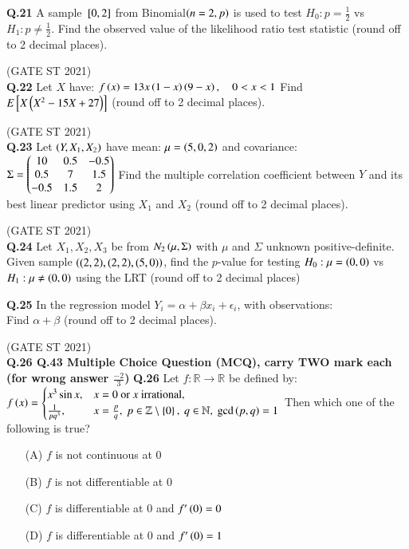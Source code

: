 \documentclass[journal,12pt,onecolumn]{IEEEtran}
\theoremstyle{remark}
\begin{document}
\textbf{Q.21}
A sample ${}\left[0,2\right]$ from Binomial$\left(n=2,p\right)$ is used to test $H_0: p = \frac12$ vs $H_1: p \ne \frac12$.  
Find the observed value of the likelihood ratio test statistic (round off to 2 decimal places).

\hfill (GATE ST 2021) \\

\textbf{Q.22}
Let $X$ have:
$
f\left(x\right) = 13x\left(1-x\right)\left(9-x\right), \quad 0 < x < 1
$
Find $E{}\left[ X\left(X^2 - 15X + 27\right)\right]$ (round off to 2 decimal places).

\hfill (GATE ST 2021) \\

\textbf{Q.23}
Let $\left(Y, X_1, X_2\right)$ have mean:
$
\mu = \left(5,0,2\right)
$
and covariance:
$
\Sigma =
\begin{pmatrix}
10 & 0.5 & -0.5 \\
0.5 & 7 & 1.5 \\
-0.5 & 1.5 & 2\end{pmatrix}
$
Find the multiple correlation coefficient between $Y$ and its best linear predictor using $X_1$ and $X_2$ (round off to 2 decimal places).

\hfill (GATE ST 2021) \\

\textbf{Q.24}
Let $X_1, X_2, X_3$ be from $N_2\left(\mu, \Sigma\right)$ with $\mu$ and $\Sigma$ unknown positive-definite.  
Given sample $\left((2,2), (2,2), (5,0)\right)$, find the $p$-value for testing $H_0: \mu = \left(0,0\right)$ vs $H_1: \mu \neq \left(0,0\right)$ using the LRT (round off to 2 decimal places)

\textbf{Q.25}
In the regression model $Y_i = \alpha + \beta x_i + \epsilon_i$,  
with observations: \\
 
\bigskip
Find $\alpha + \beta$ (round off to 2 decimal places).

\hfill (GATE ST 2021) \\

\textbf{Q.26 \text{-} Q.43 Multiple Choice Question (MCQ), carry TWO mark each (for wrong answer $\frac{-2}{3}$)}
\textbf{Q.26}
Let $f: \mathbb{R} \to \mathbb{R}$ be defined by:
$
f\left(x\right) =
\begin{cases}
x^3 \sin x, & x = 0 \ \text{or $x$ irrational}, \\
\frac{1}{p q^3}, & x = \frac{p}{q}, \ p \in \mathbb{Z} \setminus \left\{0\right\}, \ q \in \mathbb{N}, \ \gcd\left(p,q\right) = 1
\end{cases}
$
Then which one of the following is true?
\begin{enumerate}
\item[(A)] $f$ is not continuous at $0$
\item[(B)] $f$ is not differentiable at $0$
\item[(C)] $f$ is differentiable at $0$ and $f'\left(0\right) = 0$
\item[(D)] $f$ is differentiable at $0$ and $f'\left(0\right) = 1$
\end{enumerate}
\end{document}

